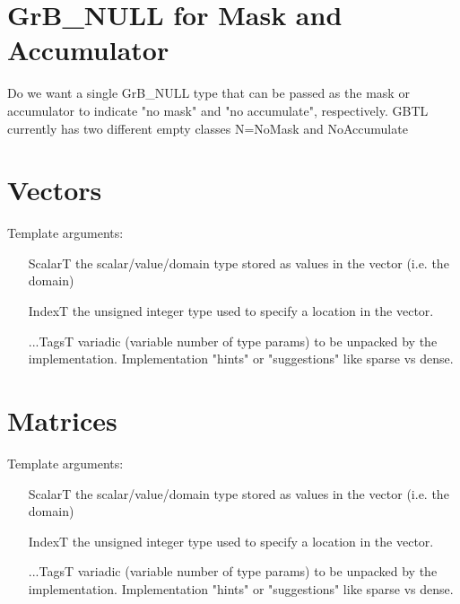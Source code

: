 \section{{\sf GrB\_NULL} for Mask and Accumulator}
\label{Sec:NoMaskNoAccum}

Do we want a single GrB_NULL type that can be passed as the mask or accumulator 
to indicate "no mask" and "no accumulate", respectively.  GBTL currently has two
different empty classes N={\sf NoMask} and {\sf NoAccumulate}

\section{Vectors}
\label{Sec:Vectors}

Template arguments:
\begin{itemize}[leftmargin=1.1in]
\item[ScalarT]  the scalar/value/domain type stored as values in the vector (i.e. the domain)
\item[IndexT]   the unsigned integer type used to specify a location in the vector.
\item[...TagsT] variadic (variable number of type params) to be unpacked by the implementation.
Implementation "hints" or "suggestions" like sparse vs dense.
\end{itemize}

\section{Matrices}
\label{Sec:Matrices}


Template arguments:
\begin{itemize}[leftmargin=1.1in]
\item[ScalarT]  the scalar/value/domain type stored as values in the vector (i.e. the domain)
\item[IndexT]   the unsigned integer type used to specify a location in the vector.
\item[...TagsT] variadic (variable number of type params) to be unpacked by the implementation.
Implementation "hints" or "suggestions" like sparse vs dense.
\end{itemize}

